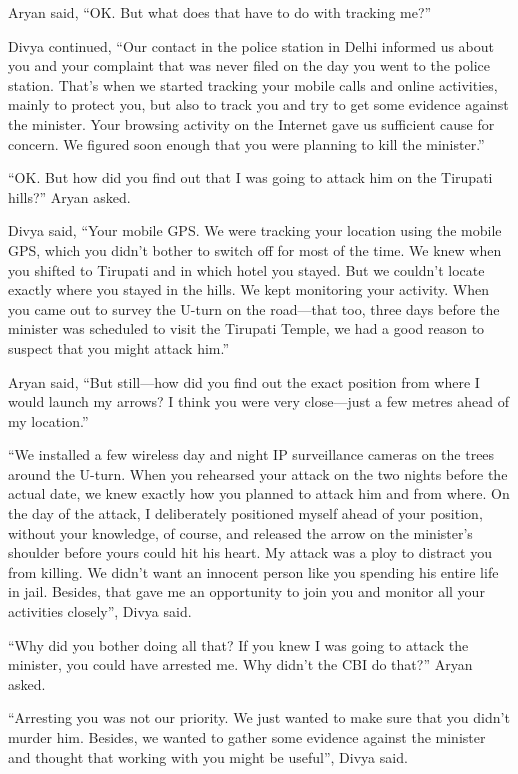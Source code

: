 Aryan said, “OK. But what does that have to do with tracking me?”

Divya continued, “Our contact in the police station in Delhi informed us about
you and your complaint that was never filed on the day you went to the police
station. That's when we started tracking your mobile calls and online
activities, mainly to protect you, but also to track you and try to get some
evidence against the minister. Your browsing activity on the Internet gave us
sufficient cause for concern. We figured soon enough that you were planning to
kill the minister.”

“OK. But how did you find out that I was going to attack him on the Tirupati
hills?” Aryan asked.

Divya said, “Your mobile GPS. We were tracking your location using the mobile
GPS, which you didn't bother to switch off for most of the time. We knew when
you shifted to Tirupati and in which hotel you stayed. But we couldn't locate
exactly where you stayed in the hills. We kept monitoring your activity. When
you came out to survey the U-turn on the road—that too, three days before the
minister was scheduled to visit the Tirupati Temple, we had a good reason to
suspect that you might attack him.”

Aryan said, “But still—how did you find out the exact position from where I
would launch my arrows? I think you were very close—just a few metres ahead of
my location.”

“We installed a few wireless day and night IP surveillance cameras on the trees
around the U-turn. When you rehearsed your attack on the two nights before the
actual date, we knew exactly how you planned to attack him and from where. On
the day of the attack, I deliberately positioned myself ahead of your position,
without your knowledge, of course, and released the arrow on the minister's
shoulder before yours could hit his heart. My attack was a ploy to distract you
from killing. We didn't want an innocent person like you spending his entire life
in jail. Besides, that gave me an opportunity to join you and monitor all your
activities closely”, Divya said.

“Why did you bother doing all that? If you knew I was going to attack the
minister, you could have arrested me. Why didn't the CBI do that?” Aryan asked.

“Arresting you was not our priority. We just wanted to make sure that you didn't
murder him. Besides, we wanted to gather some evidence against the minister and
thought that working with you might be useful”, Divya said.

